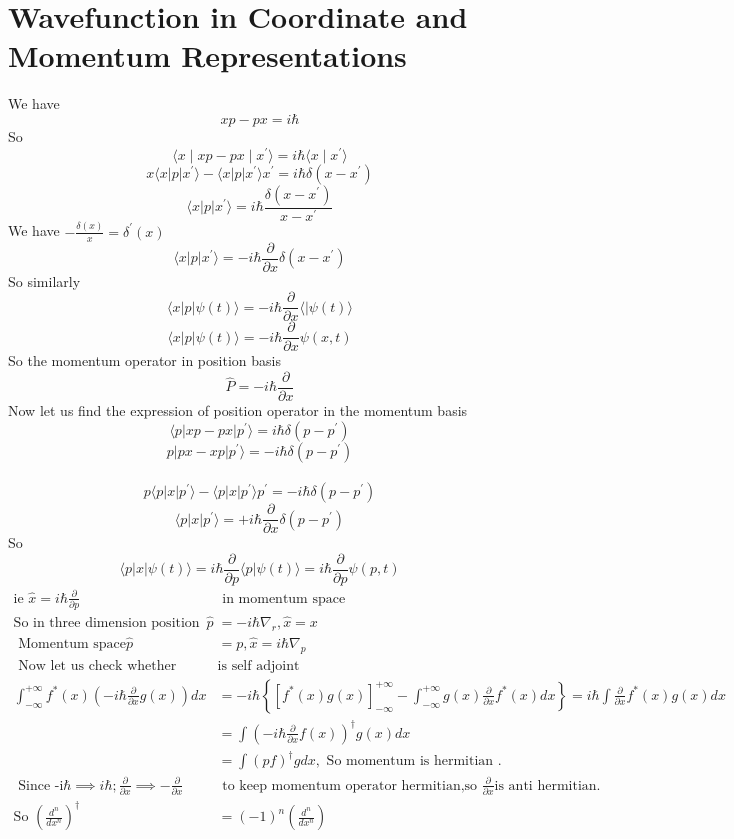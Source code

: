 \section{Wavefunction in Coordinate and Momentum Representations}
We have $$xp-px=i\hbar$$
So $$\langle x\mid xp-px\mid x^{\prime}\rangle=i\hbar\langle x\mid x^{\prime}\rangle$$
$$x\langle x |p|x^{\prime}\rangle -\langle x |p|x^{\prime}\rangle x^{\prime}=i\hbar \delta(x-x^{\prime})$$
$$\langle x|p|x^{\prime}\rangle =i\hbar \frac{\delta(x-x^{\prime})}{x-x^{\prime}}$$
We have $-\frac{\delta(x)}{x}=\delta^{\prime}(x)$\\
$$\langle x|p|x^{\prime}\rangle=-i\hbar \frac{\partial}{\partial x}\delta(x-x^{\prime})$$
So similarly $$\langle x|p|\psi(t)\rangle=-i\hbar\frac{\partial}{\partial x} \langle|\psi(t)\rangle$$
$$\langle x|p|\psi(t)\rangle=-i\hbar \frac{\partial }{\partial x}\psi(x,t)$$
So the momentum operator in position basis \\
$$\hat{P}=-i\hbar \frac{\partial}{\partial x}$$
Now let us find the expression of position operator in the momentum basis \\
$$\langle p|xp-px|p^{\prime}\rangle =i\hbar \delta (p-p^{\prime})$$
$$p|px-xp|p^{\prime}\rangle =-i\hbar \delta(p-p^{\prime})$$\\
$$p\langle p|x|p^{\prime}\rangle -\langle p|x|p^{\prime}\rangle p^{\prime}=-i\hbar\delta(p-p^{\prime})$$
$$\langle p|x|p^{\prime}\rangle=+i\hbar\frac{\partial}{\partial x}\delta(p-p^{\prime})$$
So $$\langle p|x|\psi(t)\rangle =i\hbar\frac{\partial}{\partial p} \langle p|\psi(t)\rangle=i\hbar\frac{\partial}{\partial p}\psi (p,t)$$
	$$
	\begin{aligned}
	\text{ie }\hat{x}=i\hbar\frac{\partial}{\partial p}&\text{ in momentum space}\\
	\text{So in three dimension position space}
	\hat{p}&=-i\hbar \nabla_{r}, 
	\hat{x}=x\\
\text{	Momentum space}
	\hat{p}&=p, 
	\hat{x}=i\hbar \nabla_{p}\\
\text{	Now let us check whether momentum }&\text{is self adjoint}\\
	\int_{-\infty}^{+\infty} f^*(x)\left( -i\hbar \frac{\partial}{\partial x}g(x)\right)dx&=-i\hbar\left\lbrace  \left[ f^{*}(x)g(x) \right]_{-\infty}^{+\infty}-\int_{-\infty}^{+\infty} g(x)\frac{\partial}{\partial x}f^*(x)dx\right\rbrace 
	=i\hbar \int \frac{\partial}{\partial x} f^*(x) g(x)dx\\
	&=\int\left( -i\hbar \frac{\partial}{\partial x}f(x)\right) ^{\dagger}g(x)dx\\
	&=\int(pf)^{\dagger}g dx,\text{  So momentum is hermitian .}\\
\text{	Since -i}\hbar\implies i\hbar;\frac{\partial}{\partial x} \implies -\frac{\partial}{\partial x}&\text{ to keep momentum operator hermitian,so } \frac{\partial}{\partial x} \text{is anti hermitian.}\\
	\text{So }\left( \frac{d^n}{dx^n}\right) ^{\dagger}&=(-1)^n \left( \frac{d^n}{dx^n}\right)\\
\end{aligned}
$$
